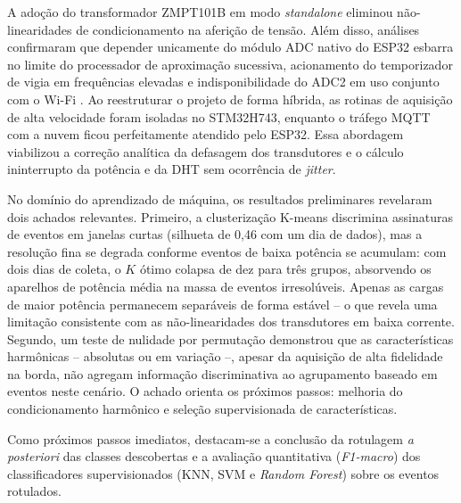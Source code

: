\documentclass[12pt]{article}
\begin{document}
A ado\c{c}\~ao do transformador ZMPT101B em modo \textit{standalone} eliminou
n\~ao-linearidades de condicionamento na aferi\c{c}\~ao de tens\~ao. Al\'em disso,
an\'alises confirmaram que depender unicamente do m\'odulo ADC nativo do ESP32
esbarra no limite do processador de aproxima\c{c}\~ao sucessiva, acionamento do
temporizador de vigia em frequ\^encias elevadas e indisponibilidade do ADC2 em uso
conjunto com o Wi-Fi \citep{ref8}. Ao reestruturar o projeto de forma h\'ibrida, as
rotinas de aquisi\c{c}\~ao de alta velocidade foram isoladas no STM32H743,
enquanto o tr\'afego MQTT com a nuvem ficou perfeitamente atendido pelo ESP32.
Essa abordagem viabilizou a corre\c{c}\~ao anal\'itica da defasagem dos
transdutores e o c\'alculo ininterrupto da pot\^encia e da DHT sem ocorr\^encia
de \textit{jitter}.

No dom\'inio do aprendizado de m\'aquina, os resultados preliminares revelaram dois
achados relevantes. Primeiro, a clusteriza\c{c}\~ao K-means discrimina assinaturas
de eventos em janelas curtas (silhueta de 0{,}46 com um dia de dados), mas a
resolu\c{c}\~ao fina se degrada conforme eventos de baixa pot\^encia se acumulam:
com dois dias de coleta, o $K$ \'otimo colapsa de dez para tr\^es grupos, absorvendo
os aparelhos de pot\^encia m\'edia na massa de eventos irresol\'uveis. Apenas as
cargas de maior pot\^encia permanecem separ\'aveis de forma est\'avel -- o que
revela uma limita\c{c}\~ao consistente com as n\~ao-linearidades dos transdutores
em baixa corrente. Segundo, um teste de nulidade por permuta\c{c}\~ao demonstrou
que as caracter\'isticas harm\^onicas -- absolutas ou em varia\c{c}\~ao --,
apesar da aquisi\c{c}\~ao de alta fidelidade na borda, n\~ao agregam informa\c{c}\~ao
discriminativa ao agrupamento baseado em eventos neste cen\'ario. O achado
orienta os pr\'oximos passos: melhoria do condicionamento harm\^onico e
sele\c{c}\~ao supervisionada de caracter\'isticas.

Como pr\'oximos passos imediatos, destacam-se a conclus\~ao da rotulagem
\textit{a posteriori} das classes descobertas e a avalia\c{c}\~ao quantitativa
(\textit{F1-macro}) dos classificadores supervisionados (KNN, SVM e
\textit{Random Forest}) sobre os eventos rotulados.


\end{document}
